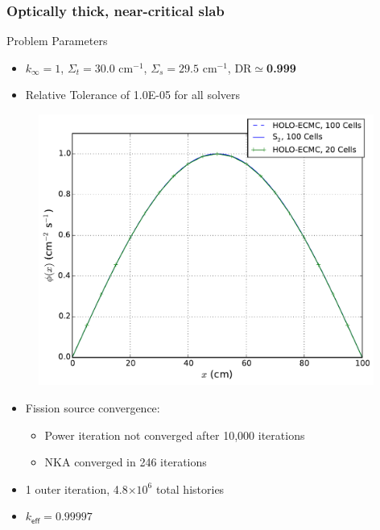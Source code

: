 \documentclass[xcolor=dvipsnames,handout,unknownkeysallowed]{beamer}
\newcommand{\keff}[0]{\ensuremath{{k}_{\textsf{eff}}} }
\newcommand{\coly}[1]{{\color{yellow} #1}}
\newlength{\wideitemsep}
\let\olditem\item
\renewcommand{\item}{\setlength{\itemsep}{\wideitemsep}\olditem}
\begin{document}
\begin{frame}
    \frametitle{\coly{Optically thick, near-critical slab}}
    \fontsize{9}{5.0}\selectfont
    \begin{block}{Problem Parameters}
    \begin{itemize}
        \item $k_\infty = 1$, $\Sigma_t = 30.0$ cm$^{-1}$, $\Sigma_s=29.5$ cm$^{-1}$,
            DR$\simeq$\textbf{0.999}
        \item Relative Tolerance of 1.0E-05 for all solvers
    \end{itemize}
    \end{block}
    \begin{minipage}{0.49\textwidth}
    \begin{figure}
    \centering
    \includegraphics[width=0.98\textwidth]{highdr_fiss_src.pdf}
    \end{figure}
    \end{minipage}
    \begin{minipage}{0.49\textwidth}
        \begin{itemize}
            \item Fission source convergence:
            \begin{itemize}
            \item Power iteration not converged after 10,000 iterations
            \item NKA converged in 246 iterations
            \end{itemize}
            \item 1 outer iteration, 4.8$\times 10^6$ total histories
            \item $\keff = 0.99997$ 
        \end{itemize}
    \end{minipage}
\end{frame}
\end{document}
